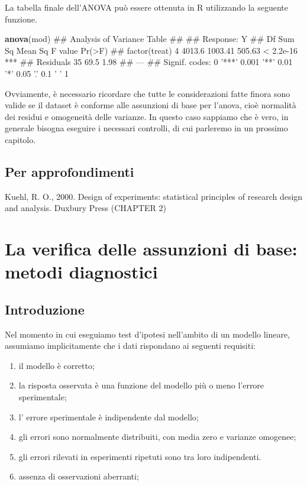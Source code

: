 \documentclass[a4paper,12pt,oneside]{book}
\providecommand{\tightlist}{%
  \setlength{\itemsep}{0pt}\setlength{\parskip}{0pt}}
\newenvironment{Shaded}{\begin{snugshade}}{\end{snugshade}}
\newcommand{\KeywordTok}[1]{\textcolor[rgb]{0.13,0.29,0.53}{\textbf{#1}}}
\newcommand{\NormalTok}[1]{#1}
\theoremstyle{definition}
\theoremstyle{definition}
\theoremstyle{definition}
\theoremstyle{remark}
\begin{document}
La tabella finale dell'ANOVA può essere ottenuta in R utilizzando la
seguente funzione.

\begin{Shaded}
\begin{Highlighting}[]
\KeywordTok{anova}\NormalTok{(mod)}
\NormalTok{## Analysis of Variance Table}
\NormalTok{## }
\NormalTok{## Response: Y}
\NormalTok{##               Df Sum Sq Mean Sq F value    Pr(>F)    }
\NormalTok{## factor(treat)  4 4013.6 1003.41  505.63 < 2.2e-16 ***}
\NormalTok{## Residuals     35   69.5    1.98                      }
\NormalTok{## ---}
\NormalTok{## Signif. codes:  0 '***' 0.001 '**' 0.01 '*' 0.05 '.' 0.1 ' ' 1}
\end{Highlighting}
\end{Shaded}

Ovviamente, è necessario ricordare che tutte le considerazioni fatte
finora sono valide se il dataset è conforme alle assunzioni di base per
l'anova, cioè normalità dei residui e omogeneità delle varianze. In
questo caso sappiamo che è vero, in generale bisogna eseguire i
necessari controlli, di cui parleremo in un prossimo capitolo.

\section{Per approfondimenti}\label{per-approfondimenti-1}

Kuehl, R. O., 2000. Design of experiments: statistical principles of
research design and analysis. Duxbury Press (CHAPTER 2)

\chapter{La verifica delle assunzioni di base: metodi
diagnostici}\label{la-verifica-delle-assunzioni-di-base-metodi-diagnostici}

\section{Introduzione}\label{introduzione-2}

Nel momento in cui eseguiamo test d'ipotesi nell'ambito di un modello
lineare, assumiamo implicitamente che i dati rispondano ai seguenti
requisiti:

\begin{enumerate}
\def\labelenumi{\arabic{enumi}.}
\tightlist
\item
  il modello è corretto;
\item
  la risposta osservata è una funzione del modello più o meno l'errore
  sperimentale;
\item
  l' errore sperimentale è indipendente dal modello;
\item
  gli errori sono normalmente distribuiti, con media zero e varianze
  omogenee;
\item
  gli errori rilevati in esperimenti ripetuti sono tra loro
  indipendenti.
\item
  assenza di osservazioni aberranti;
\end{enumerate}
\end{document}
